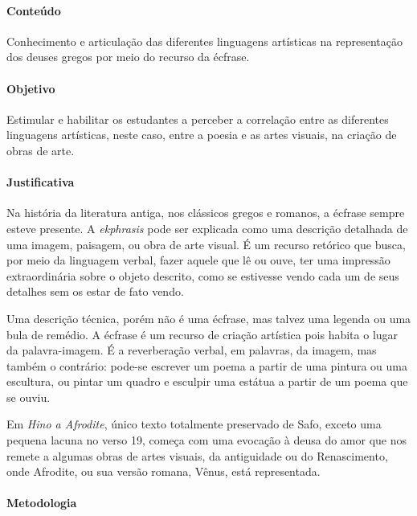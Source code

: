 \documentclass[12pt]{extarticle}
\begin{document}
\paragraph{Conteúdo} Conhecimento e articulação das diferentes linguagens
artísticas na representação dos deuses gregos por meio do recurso da écfrase.

\paragraph{Objetivo} Estimular e habilitar os estudantes a perceber a 
correlação entre as diferentes linguagens artísticas, neste caso, entre a 
poesia e as artes visuais, na criação de obras de arte. 

\paragraph{Justificativa} Na história da literatura antiga, nos clássicos gregos
e romanos, a écfrase sempre esteve presente. A \textit{ekphrasis} pode ser 
explicada como uma descrição detalhada de uma imagem, paisagem, ou obra de 
arte visual. É um recurso retórico que busca, por meio da linguagem verbal, 
fazer aquele que lê ou ouve, ter uma impressão extraordinária sobre o objeto 
descrito, como se estivesse vendo cada um de seus detalhes sem os estar de fato vendo.

Uma descrição técnica, porém não é uma écfrase, mas talvez uma legenda ou uma
bula de remédio. A écfrase é um recurso de criação artística pois habita o lugar 
da palavra-imagem. É a reverberação verbal, em palavras, da imagem, mas também 
o contrário: pode-se escrever um poema a partir de uma pintura ou uma escultura, 
ou pintar um quadro e esculpir uma estátua a partir de um poema que se ouviu. 

Em \textit{Hino a Afrodite}, único texto totalmente preservado de Safo, exceto 
uma pequena lacuna no verso 19, começa com uma evocação à deusa do amor que
nos remete a algumas obras de artes visuais, da antiguidade ou do Renascimento,
onde Afrodite, ou sua versão romana, Vênus, está representada. 


\paragraph{Metodologia} 
\end{document}
